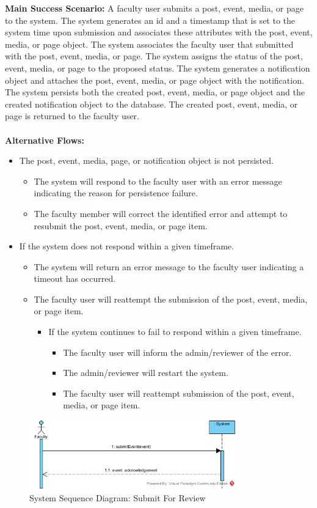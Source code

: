 \textbf{Main Success Scenario:} A faculty user submits a post, event, media, or page to the system. The system generates an id and a timestamp that is set to the system time upon submission and associates these attributes with the post, event, media, or page object. The system associates the faculty user that submitted with the post, event, media, or page. The system assigns the status of the post, event, media, or page to the proposed status. The system generates a notification object and attaches the post, event, media, or page object with the notification. The system persists both the created post, event, media, or page object and the created notification object to the database. The created post, event, media, or page is returned to the faculty user. \\
\\
\textbf{Alternative Flows:}
\begin{itemize}
    \item The post, event, media, page, or notification object is not persisted.
    \begin{itemize}
        \item The system will respond to the faculty user with an error message indicating the reason for persistence failure.
        \item The faculty member will correct the identified error and attempt to resubmit the post, event, media, or page item.
    \end{itemize}
    \item If the system does not respond within a given timeframe.
    \begin{itemize}
        \item The system will return an error message to the faculty user indicating a timeout has occurred.
        \item The faculty user will reattempt the submission of the post, event, media, or page item.
        \begin{itemize}
            \item If the system continues to fail to respond within a given timeframe.
            \begin{itemize}
                \item The faculty user will inform the admin/reviewer of the error.
                \item The admin/reviewer will restart the system.
                \item The faculty user will reattempt submission of the post, event, media, or page item.
            \end{itemize}
        \end{itemize}
    \end{itemize}
\end{itemize}

\begin{figure}[H]
    \centering
    \includegraphics[width=0.8\textwidth]{images/SSD-UC08-SubmitForReview.png}
    \centering
    \caption{System Sequence Diagram: Submit For Review}
\end{figure}